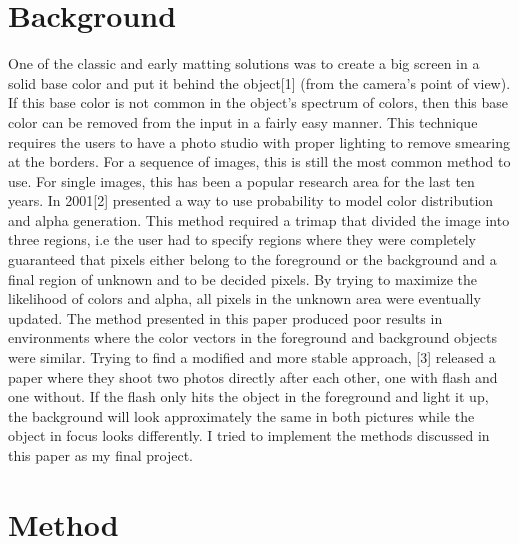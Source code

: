 \documentclass[10pt,letterpaper,twocolumn]{article}
\begin{document}
\section{Background}
One of the classic and early matting solutions was to create a big screen in a solid base color and put it behind the object[1] (from the camera's point of view). If this base color is not common in the object's spectrum of colors, then this base color can be removed from the input in a fairly easy manner. This technique requires the users to have a photo studio with proper lighting to remove smearing at the borders. For a sequence of images, this is still the most common method to use. For single images, this has been a popular research area for the last ten years. In 2001[2] presented a way to use probability to model color distribution and alpha generation. This method required a trimap that divided the image into three regions, i.e the user had to specify regions where they were completely guaranteed that pixels either belong to the foreground or the background and a final region of unknown and to be decided pixels. By trying to maximize the likelihood of colors and alpha, all pixels in the unknown area were eventually updated. The method presented in this paper produced poor results in environments where the color vectors in the foreground and background objects were similar. Trying to find a modified and more stable approach, [3] released a paper where they shoot two photos directly after each other, one with flash and one without. If the flash only hits the object in the foreground and light it up, the background will look approximately the same in both pictures while the object in focus looks differently. I tried to implement the methods discussed in this paper as my final project.

\section{Method}
\end{document}

